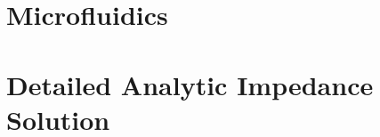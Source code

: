 \documentclass[12pt]{report}
\begin{document}
%

%

\begin{appendices}

\chapter{Microfluidics}


\chapter[Analytic IS]{Detailed Analytic Impedance Solution}


\end{appendices}
%
%
%
%


{} 
\singlespacing
\printbibliography
\end{document}
